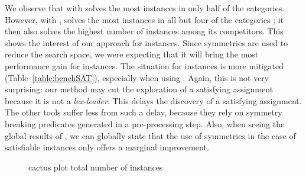 We observe that \cdclsym{} with \saucy{} solves the most instances in only half
of the \unsat categories. However, with \bliss{}, \cdclsym{} solves the most
instances in all but four of the \unsat categories ; it then also solves the
highest number of instances among its competitors. This shows the interest
of our approach for \unsat instances. Since symmetries are used to reduce the
search space, we were expecting that it will bring the most performance gain
for \unsat instances.
The situation for \sat instances is more mitigated (Table~\ref{table:benchSAT}),
especially when using \saucy{}. Again, this is not very surprising: our method
may cut the exploration of a satisfying assignment because it is not a
\textit{lex-leader}. This delays the discovery of a satisfying assignment. The
other tools suffer less from such a delay, because they rely on symmetry
breaking predicates generated in a pre-processing step. Also, when seeing the
global results of \minisat{}, we can globally state that the use of symmetries
in the case of satisfiable instances only offers a marginal improvement.
\begin{figure}[!htbp]
 \centering
 \qquad
 \caption{cactus plot  total number of instances}%
 \label{fig:cactus}%
\end{figure}

